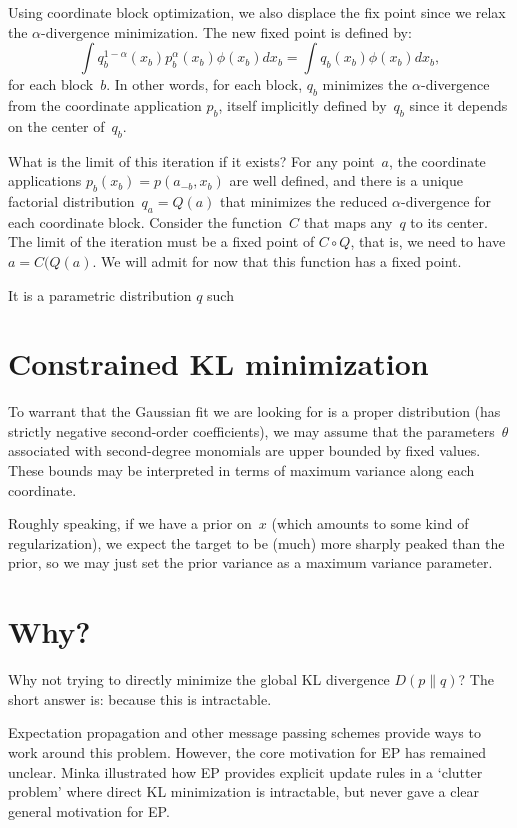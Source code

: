 \documentclass{article}
\begin{document}
Using coordinate block optimization, we also displace the fix point since we relax the $\alpha$-divergence minimization. The new fixed point is defined by:
$$
\int q_b^{1-\alpha}(x_b)p_b^\alpha(x_b) \phi(x_b) dx_b
= \int q_b(x_b) \phi(x_b) dx_b,
$$
for each block~$b$. In other words, for each block, $q_b$ minimizes the $\alpha$-divergence from the coordinate application $p_b$, itself implicitly defined by~$q_b$ since it depends on the center of~$q_b$.

What is the limit of this iteration if it exists? For any point~$a$, the coordinate applications $p_b(x_b)=p(a_{-b},x_b)$ are well defined, and there is a unique factorial distribution~$q_a=Q(a)$ that minimizes the reduced $\alpha$-divergence for each coordinate block. Consider the function~$C$ that maps any~$q$ to its center. The limit of the iteration must be a fixed point of $C\circ Q$, that is, we need to have $a = C(Q(a)$. We will admit for now that this function has a fixed point. 



It is a parametric distribution $q$ such 


\section{Constrained KL minimization}

To warrant that the Gaussian fit we are looking for is a proper distribution (has strictly negative second-order coefficients), we may assume that the parameters~$\theta$ associated with second-degree monomials are upper bounded by fixed values. These bounds may be interpreted in terms of maximum variance along each coordinate.

Roughly speaking, if we have a prior on~$x$ (which amounts to some kind of regularization), we expect the target to be (much) more sharply peaked than the prior, so we may just set the prior variance as a maximum variance parameter. 


\section{Why?}

Why not trying to directly minimize the global KL divergence $D(p\|q)$? The short answer is: because this is intractable.

Expectation propagation and other message passing schemes \cite{Minka-01,Minka-05} provide ways to work around this problem. However, the core motivation for EP has remained unclear. Minka illustrated how EP provides explicit update rules in a `clutter problem' where direct KL minimization is intractable, but never gave a clear general motivation for EP.
\end{document}
